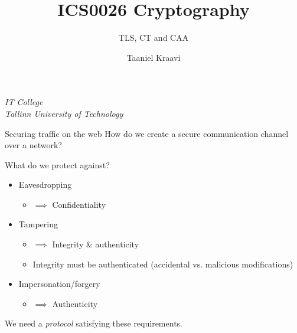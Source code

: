

\usepackage[dvipsnames]{xcolor}

\usepackage{booktabs}

\usepackage{fancyvrb}

\usepackage{csquotes}

\usepackage{graphicx}
\graphicspath{ {../../images/} }

\usepackage{pgfplots}
\usetikzlibrary{positioning,calc,external}

\usepackage{crysymb}

\renewcommand*{\arraystretch}{1.2}

\usepackage{soul}
\usepackage[en-GB]{datetime2}

\usetikzlibrary{positioning,calc}
\graphicspath{ {../../images/} }

\title{ICS0026 Cryptography}
\subtitle{TLS, CT and CAA}
\date{}
\author{Taaniel Kraavi}
\institute%
{%
  \textit{IT College}\\
  \textit{Tallinn University of Technology}
}


\begin{frame}
  \titlepage
\end{frame}

\begin{frame}{Securing traffic on the web}
  How do we create a secure communication channel over a network?

  \vspace*{1em}

  \pause
  What do we protect against?
  \begin{itemize}[<+(1)->]
    \item Eavesdropping
    \begin{itemize}
      \item $\implies$ Confidentiality
    \end{itemize}
    \item Tampering
    \begin{itemize}
      \item $\implies$ Integrity \& authenticity
      \item Integrity must be authenticated (accidental vs. malicious modifications)
    \end{itemize}
    \item Impersonation/forgery
    \begin{itemize}
      \item $\implies$ Authenticity
    \end{itemize}
  \end{itemize}

  \vspace*{1em}

  \pause
  We need a \emph{protocol} satisfying these requirements.
\end{frame}

